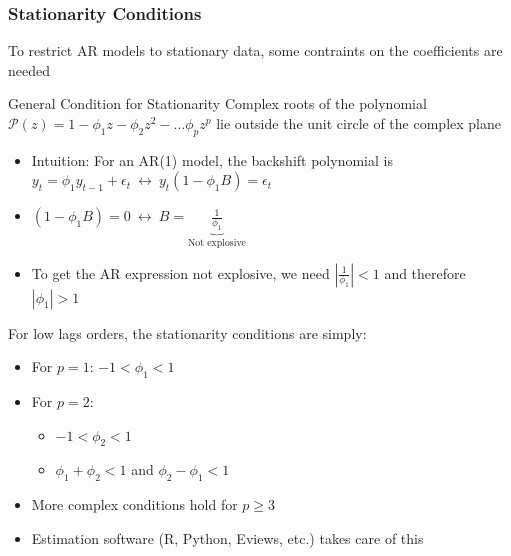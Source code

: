 \documentclass{beamer}
\begin{document}

\begin{frame}
  \frametitle{Stationarity Conditions}
  To restrict AR models to stationary data, some contraints on the coefficients are needed

  \begin{alertblock}{General Condition for Stationarity}
    Complex roots of the polynomial $\mathcal{P}(z) = 1 - \phi_1z - \phi_2 z^{2} - \dots \phi_p z^{p}$ lie outside the unit circle of the complex plane
  \end{alertblock}

  \begin{itemize}
  \item Intuition: For an AR(1) model, the backshift polynomial is $y_t = \phi_1 y_{t-1} + \epsilon_t \ \leftrightarrow \ y_t(1-\phi_1B) = \epsilon_t$
  \item $(1-\phi_1B) = 0 \ \leftrightarrow \ B= \underbrace{\frac{1}{\phi_1}}_{\text{Not explosive}}$
  \item To get the AR expression not explosive, we need $|\frac{1}{\phi_1}| < 1$ and therefore $|\phi_1| > 1$ 
  \end{itemize}

  For low lags orders, the stationarity conditions are simply:\\
  
  \begin{itemize}
  \item For $p=1$: $-1 < \phi_1 < 1$
  \item For $p=2$:
    \begin{itemize}
    \item $-1 < \phi_2 < 1$
    \item $ \phi_1 + \phi_2 < 1$ and $ \phi_2 - \phi_1 < 1$
    \end{itemize}
  \item More complex conditions hold for $p \geq 3$
  \item Estimation software (R, Python, Eviews, etc.) takes care of this
  \end{itemize}
  
\end{frame}
\end{document}
